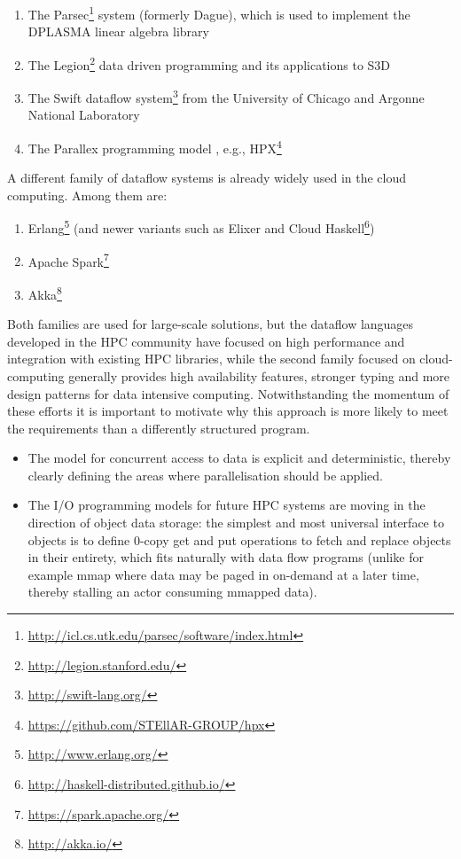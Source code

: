 \documentclass[11pt,a4paper]{article}
\begin{document}
\begin{enumerate}
\item The
  Parsec\footnote{\url{http://icl.cs.utk.edu/parsec/software/index.html} }
  system (formerly Dague), which is used to implement the DPLASMA
  linear algebra library
 \item The Legion\footnote{\url{http://legion.stanford.edu/}{} } data
   driven programming and its applications to S3D
 \item The Swift dataflow system\footnote{\url{http://swift-lang.org/}
   } from the University of Chicago and Argonne National Laboratory
 \item The Parallex programming model \citep{Kaiser5364511}, e.g.,
   HPX\footnote{\url{https://github.com/STEllAR-GROUP/hpx} }
\end{enumerate}

A different family of dataflow systems is already widely used in the
cloud computing.  Among them are:
\begin{enumerate}
\item Erlang\footnote{\url{http://www.erlang.org/} } (and newer
  variants such as Elixer and Cloud
  Haskell\footnote{\url{http://haskell-distributed.github.io/} })
  \item Apache Spark\footnote{\url{https://spark.apache.org/} }
  \item Akka\footnote{\url{http://akka.io/} }
\end{enumerate}

Both families are used for large-scale solutions, but the dataflow
languages developed in the HPC community have focused on high
performance and integration with existing HPC libraries, while the
second family focused on cloud-computing generally provides high
availability features, stronger typing and more design patterns for
data intensive computing.  Notwithstanding the momentum of these
efforts it is important to motivate why this approach is more likely
to meet the requirements than a differently structured program.

\begin{itemize}
\item The model for concurrent access to data is
explicit and deterministic, thereby clearly defining the areas where
parallelisation should be applied.  
\item The I/O programming models for future HPC systems are moving in
  the direction of object data storage: the simplest and most
  universal interface to objects is to define 0-copy get and put
  operations to fetch and replace objects in their entirety, which
  fits naturally with data flow programs (unlike for example mmap
  where data may be paged in on-demand at a later time, thereby
  stalling an actor consuming mmapped data).
\end{itemize}
\end{document}
